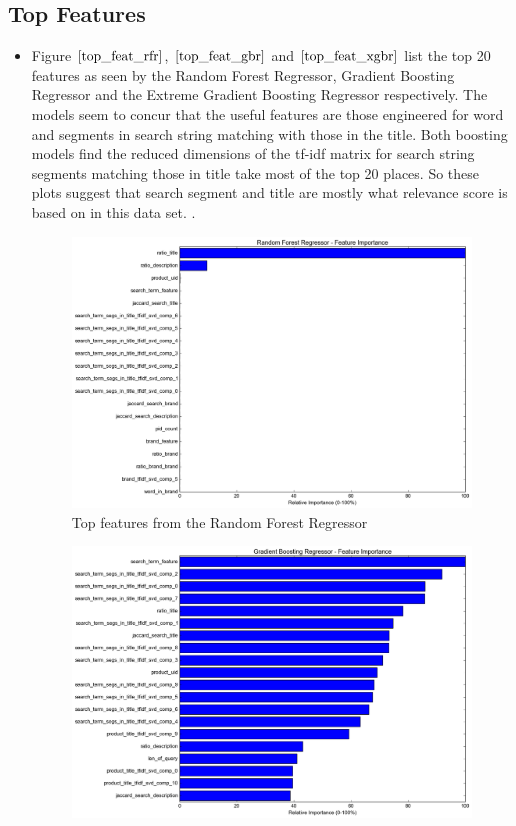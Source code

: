 \documentclass[twoside,12pt]{article}
\begin{document}
\subsection{Top Features}
\begin{itemize}
\FloatBarrier
\item
Figure $\eqref{top_feat_rfr}$, $\eqref{top_feat_gbr}$ and $\eqref{top_feat_xgbr}$ list the top 20 features as seen by the Random Forest Regressor, Gradient Boosting Regressor and the Extreme Gradient Boosting Regressor respectively. The models seem to concur that the useful features are those engineered for word and segments in search string matching with those in the title. Both boosting models find the reduced dimensions of the tf-idf matrix for search string segments matching those in title take most of the top 20 places. So these plots suggest that search segment and title are mostly what relevance score is based on in this data set.
\FloatBarrier.
\begin{figure}[!htbp]
	\centering
	\includegraphics[scale=.43]{DataVisualization/rfr_fp.png} 
	\caption{Top features from the Random Forest Regressor}
	\label{top_feat_rfr}
\end{figure}
\begin{figure}[!htbp]
	\centering
	\includegraphics[scale=.43]{DataVisualization/gbr_fp.png} 

\end{figure}
\end{itemize}
\end{document}
